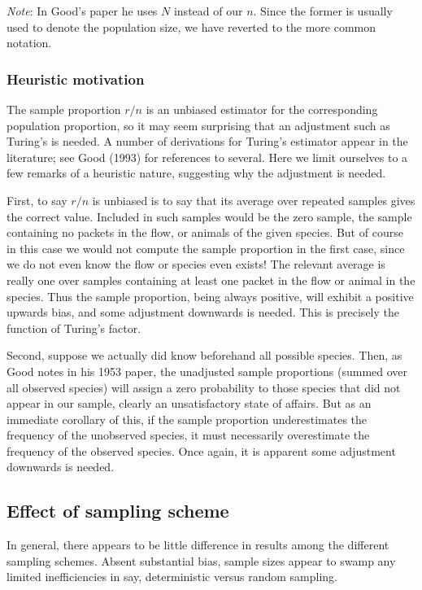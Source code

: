 \documentclass{paper}
\begin{document}
\emph{Note}: In Good's paper he uses $N$ instead of our $n$. Since the former
is usually used to denote the population size, we have reverted to the more
common notation.

\subsubsection{Heuristic motivation}

The sample proportion $r/n$ is an unbiased estimator for the corresponding
population proportion, so it may seem surprising that an adjustment such as
Turing's is needed. A number of derivations for Turing's estimator appear in
the literature; see Good (1993) for references to several. Here we limit
ourselves to a few remarks of a heuristic nature, suggesting why the adjustment
is needed.

First, to say $r/n$ is unbiased is to say that its average over repeated samples
gives the correct value. Included in such samples would be the zero sample, the
sample containing no packets in the flow, or animals of the given species. But
of course in this case we would not compute the sample proportion in the first
case, since we do not even know the flow or species even exists! The relevant
average is really one over samples containing at least one packet in the flow
or animal in the species. Thus the sample proportion, being always positive,
will exhibit a positive upwards bias, and some adjustment downwards is needed.
This is precisely the function of Turing's factor.

Second, suppose we actually did know beforehand all possible species. Then, as
Good notes in his 1953 paper, the unadjusted sample proportions (summed over
all observed species) will assign a zero probability to those species that did
not appear in our sample, clearly an unsatisfactory state of affairs. But as an
immediate corollary of this, if the sample proportion underestimates the
frequency of the unobserved species, it must necessarily overestimate the
frequency of the observed species. Once again, it is apparent some adjustment
downwards is needed.

\subsection{Effect of sampling scheme}

In general, there appears to be little difference in results among the
different sampling schemes. Absent substantial bias, sample sizes appear to
swamp any limited inefficiencies in say, deterministic versus random sampling.
\end{document}
